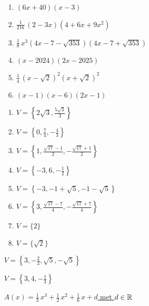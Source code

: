 \documentclass{ximera}
\begin{document}
\begin{oplossing} 
\begin{enumerate}
\item
\hyperlink{oef4.5}{$(6x+40)(x-3)$}
\item
\hyperlink{oef4.5}{$\frac{1}{216}\,(2-3x)(4+6x+9x^2)$}
\item
\hyperlink{oef4.5}{$\frac{1}{8}\,x^3(4x-7-\sqrt{353})(4x-7+\sqrt{353})$}
\item
\hyperlink{oef4.5}{$(x-2024)(2x-2025)$}
\item
\hyperlink{oef4.5}{$\frac{1}{4}\,(x-\sqrt{2})^2(x+\sqrt{2})^2$}
\item
\hyperlink{oef4.5}{$(x-1)(x-6)(2x-1)$}
\end{enumerate}
\end{oplossing} 

\begin{oplossing} 
\begin{enumerate}
\item
\hyperlink{oef4.6}{$V = \left\{ 2\sqrt{3},\frac{5\sqrt{3}}{3} \right\}$}
\item
\hyperlink{oef4.6}{$V = \left\{0,\frac{7}{4},-\frac{4}{3}\right\}$}
\item
\hyperlink{oef4.6}{$V = \left\{ 1, \frac{\sqrt{17}-1}{2}, -\frac{\sqrt{17}+1}{2} \right\}$}
\item
\hyperlink{oef4.6}{$V = \left\{-3,6,-\frac{1}{2}\right\}$}
\item
\hyperlink{oef4.6}{$V = \left\{-3,-1+\sqrt{5}, -1-\sqrt{5}\right\}$}
\item
\hyperlink{oef4.6}{$V = \left\{ 3, \frac{\sqrt{17}-7}{4}, -\frac{\sqrt{17}+7}{4} \right\}$}
\item
\hyperlink{oef4.6}{$V = \{ 2 \}$}
\item
\hyperlink{oef4.6}{$V = \{\sqrt{2}\}$}
\end{enumerate}
\end{oplossing} 

\pagebreak

\begin{oplossing} 
\hyperlink{oef4.7}{$V = \left\{ 3, -\frac{2}{3}, \sqrt{5}, -\sqrt{5} \right\}$}
\end{oplossing} 

\begin{oplossing} 
\hyperlink{oef4.8}{$V = \left\{ 3, 4, -\frac{1}{3}\right\}$}
\end{oplossing} 

\begin{oplossing} 
\hyperlink{oef4.9}{$A(x) = \frac{1}{3}\,x^3 + \frac{1}{2}\,x^2 + \frac{1}{6}\,x + d$ met $d \in \mathbb{R}$}
\end{oplossing} 
\end{document}
